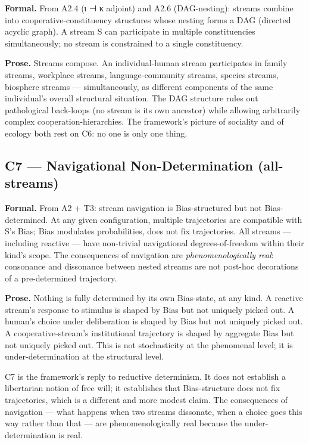 \documentclass[11pt, openany]{book}
\begin{document}
\textbf{Formal.} From A2.4 (ι ⊣ κ adjoint) and A2.6 (DAG-nesting): streams combine into cooperative-constituency structures whose nesting forms a DAG (directed acyclic graph). A stream S can participate in multiple constituencies simultaneously; no stream is constrained to a single constituency.

\textbf{Prose.} Streams compose. An individual-human stream participates in family streams, workplace streams, language-community streams, species streams, biosphere streams --- simultaneously, as different components of the same individual's overall structural situation. The DAG structure rules out pathological back-loops (no stream is its own ancestor) while allowing arbitrarily complex cooperation-hierarchies. The framework's picture of sociality and of ecology both rest on C6: no one is only one thing.

\subsection{C7 --- Navigational Non-Determination (all-streams)}

\textbf{Formal.} From A2 + T3: stream navigation is Bias-structured but not Bias-determined. At any given configuration, multiple trajectories are compatible with S's Bias; Bias modulates probabilities, does not fix trajectories. All streams --- including reactive --- have non-trivial navigational degrees-of-freedom within their kind's scope. The consequences of navigation are \textit{phenomenologically real}: consonance and dissonance between nested streams are not post-hoc decorations of a pre-determined trajectory.

\textbf{Prose.} Nothing is fully determined by its own Bias-state, at any kind. A reactive stream's response to stimulus is shaped by Bias but not uniquely picked out. A human's choice under deliberation is shaped by Bias but not uniquely picked out. A cooperative-stream's institutional trajectory is shaped by aggregate Bias but not uniquely picked out. This is not stochasticity at the phenomenal level; it is under-determination at the structural level.

C7 is the framework's reply to reductive determinism. It does not establish a libertarian notion of free will; it establishes that Bias-structure does not fix trajectories, which is a different and more modest claim. The consequences of navigation --- what happens when two streams dissonate, when a choice goes this way rather than that --- are phenomenologically real because the under-determination is real.
\end{document}
